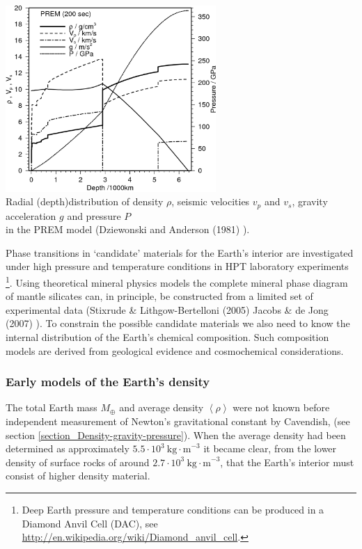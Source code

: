 \begin{center}
\includegraphics[width=8cm]{images/gravity/PREM-inc-pressure}\\
{\captionfont Radial (depth)distribution of density $\rho$, 
seismic velocities $v_p$ and $v_s$,
gravity acceleration $g$ and pressure $P$ \\
in the PREM model (Dziewonski and Anderson (1981) \cite{dzan81}).}
\end{center}


Phase transitions in `candidate' materials for the Earth's interior
are investigated under high pressure and temperature conditions in
HPT laboratory experiments
\footnote{
Deep Earth pressure and temperature conditions can be produced in 
a Diamond Anvil Cell (DAC),
see \url{http://en.wikipedia.org/wiki/Diamond\_anvil\_cell}.
}.
Using theoretical mineral physics models the complete mineral phase 
diagram of mantle silicates can, in principle,
be constructed from a limited set of experimental data
(Stixrude \& Lithgow-Bertelloni (2005) \cite{stli05,stli05b}
Jacobs \& de Jong (2007) \cite{jade07}).  
To constrain the possible candidate materials we also need to know 
the internal distribution of the Earth's chemical composition.
Such composition models are derived from geological evidence and
cosmochemical considerations.

\subsubsection{Early models of the Earth's density}

The total Earth mass $M_{\oplus}$ and average density $\left <\rho \right >$
were not known 
before independent measurement of Newton's gravitational 
constant by Cavendish, 
(see section \ref{section_Density-gravity-pressure}).
When the average density had been determined as approximately 
$5.5 \cdot 10^3~\mathrm{kg\cdot m}^{-3}$ it became clear, 
from the lower density of surface rocks of around 
$2.7 \cdot 10^3~\mathrm{kg\cdot m}^{-3}$,
that the Earth's interior must consist of higher density material.

